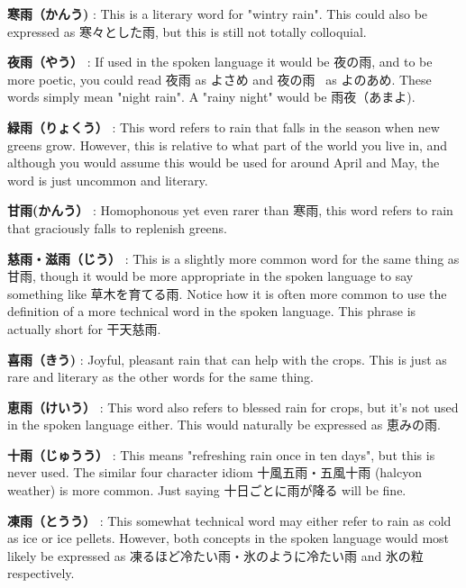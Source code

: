 \par{\textbf{寒雨（かんう) }: This is a literary word for "wintry rain". This could also be expressed as 寒々とした雨, but this is still not totally colloquial. }

\par{\textbf{夜雨（やう） }: If used in the spoken language it would be 夜の雨, and to be more poetic, you could read 夜雨 as よさめ and 夜の雨  as よのあめ. These words simply mean "night rain". A "rainy night" would be 雨夜（あまよ). }

\par{\textbf{緑雨（りょくう） }: This word refers to rain that falls in the season when new greens grow. However, this is relative to what part of the world you live in, and although you would assume this would be used for around April and May, the word is just uncommon and literary. }

\par{\textbf{甘雨(かんう） }: Homophonous yet even rarer than 寒雨, this word refers to rain that graciously falls to replenish greens. }

\par{\textbf{慈雨・滋雨（じう） }: This is a slightly more common word for the same thing as 甘雨, though it would be more appropriate in the spoken language to say something like 草木を育てる雨. Notice how it is often more common to use the definition of a more technical word in the spoken language. This phrase is actually short for 干天慈雨. }

\par{\textbf{喜雨（きう) }: Joyful, pleasant rain that can help with the crops. This is just as rare and literary as the other words for the same thing. }

\par{\textbf{恵雨（けいう） }: This word also refers to blessed rain for crops, but it's not used in the spoken language either. This would naturally be expressed as 恵みの雨. }

\par{\textbf{十雨（じゅうう） }: This means "refreshing rain once in ten days", but this is never used. The similar four character idiom 十風五雨・五風十雨 (halcyon weather) is more common. Just saying 十日ごとに雨が降る will be fine. }

\par{\textbf{凍雨（とうう） }: This somewhat technical word may either refer to rain as cold as ice or ice pellets. However, both concepts in the spoken language would most likely be expressed as 凍るほど冷たい雨・氷のように冷たい雨 and 氷の粒 respectively. }

